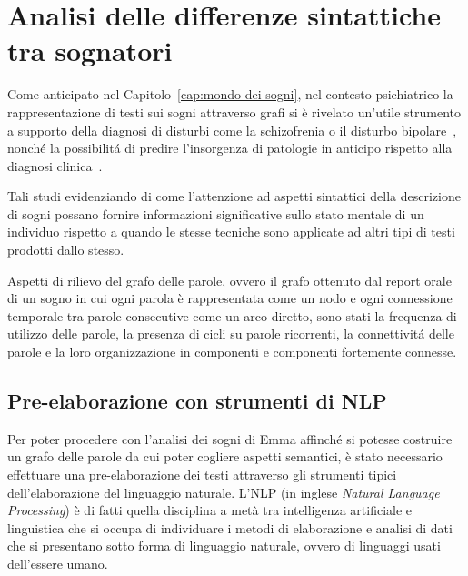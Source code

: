 \section{Analisi delle differenze sintattiche tra sognatori} \label{sec:analisi-delle-differenze-sintattiche-tra-sognatori}

Come anticipato nel Capitolo~\ref{cap:mondo-dei-sogni}, nel contesto psichiatrico la rappresentazione di testi sui
sogni attraverso grafi si \`e rivelato un'utile strumento a supporto della diagnosi di disturbi come la schizofrenia
o il disturbo bipolare~\cite{mota2014graph}, nonch\'e la possibilit\'a di predire l'insorgenza di patologie in
anticipo rispetto alla diagnosi clinica~\cite{mota2017thought}.

Tali studi evidenziando di come l'attenzione ad aspetti sintattici della descrizione di sogni possano fornire
informazioni significative sullo stato mentale di un individuo rispetto a quando le stesse tecniche sono applicate
ad altri tipi di testi prodotti dallo stesso.

Aspetti di rilievo del grafo delle parole, ovvero il grafo ottenuto dal report orale di un sogno in cui
ogni parola \`e rappresentata come un nodo e ogni connessione temporale tra parole consecutive come un arco diretto,
sono stati la frequenza di utilizzo delle parole, la presenza di cicli su parole ricorrenti, la connettivit\'a delle
parole e la loro organizzazione in componenti e componenti fortemente connesse. \newline

\subsection{Pre-elaborazione con strumenti di NLP}\label{subec:pre-elaborazione-con-NLP}
Per poter procedere con l'analisi dei sogni di Emma affinché si potesse costruire un grafo delle parole
da cui poter cogliere aspetti semantici, è stato necessario effettuare una pre-elaborazione dei testi
attraverso gli strumenti tipici dell'elaborazione del linguaggio naturale.
L'NLP (in inglese \textit{Natural Language Processing}) è di fatti quella disciplina a metà tra intelligenza artificiale
e linguistica che si occupa di individuare i metodi di elaborazione e analisi di dati che si presentano sotto forma di
linguaggio naturale, ovvero di linguaggi usati dell'essere umano. \newline

